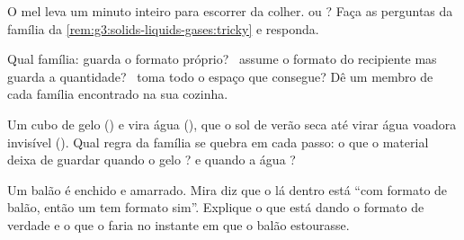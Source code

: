 \begin{exercise}[$\star$]\label{exo:g3:solids-liquids-gases:8}
O mel leva um minuto inteiro para escorrer da colher.  ou
? Faça as perguntas da família da
\cref{rem:g3:solids-liquids-gases:tricky} e responda.
\end{exercise}

\begin{exercise}[$\star$]\label{exo:g3:solids-liquids-gases:9}
Qual família: guarda o formato próprio? \ assume o formato do
recipiente mas guarda a quantidade? \ toma todo o espaço que
consegue? Dê um membro de cada família encontrado na sua cozinha.
\end{exercise}

\begin{exercise}[$\star\star$]\label{exo:g3:solids-liquids-gases:10}
Um cubo de gelo ()  e vira água (), que o sol de
verão seca até virar água voadora invisível (). Qual regra da
família se quebra em cada passo: o que o material deixa de guardar
quando o gelo ? e quando a água ?
\end{exercise}

\begin{exercise}[$\star\star$]\label{exo:g3:solids-liquids-gases:11}
Um balão é enchido e amarrado. Mira diz que o  lá dentro está ``com
formato de balão, então um  tem formato sim''. Explique o que
está dando o formato de verdade e o que o  faria no instante em que
o balão estourasse.
\end{exercise}
